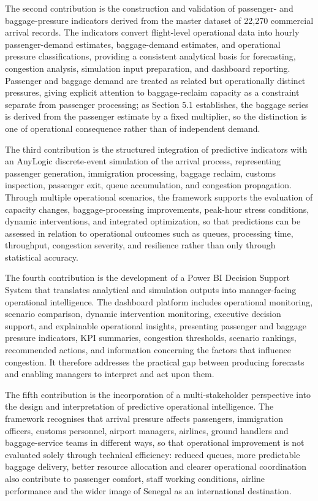 The second contribution is the construction and validation of passenger- and baggage-pressure indicators derived from the master dataset of 22,270 commercial arrival records. The indicators convert flight-level operational data into hourly passenger-demand estimates, baggage-demand estimates, and operational pressure classifications, providing a consistent analytical basis for forecasting, congestion analysis, simulation input preparation, and dashboard reporting. Passenger and baggage demand are treated as related but operationally distinct pressures, giving explicit attention to baggage-reclaim capacity as a constraint separate from passenger processing; as Section 5.1 establishes, the baggage series is derived from the passenger estimate by a fixed multiplier, so the distinction is one of operational consequence rather than of independent demand.

The third contribution is the structured integration of predictive indicators with an AnyLogic discrete-event simulation of the arrival process, representing passenger generation, immigration processing, baggage reclaim, customs inspection, passenger exit, queue accumulation, and congestion propagation. Through multiple operational scenarios, the framework supports the evaluation of capacity changes, baggage-processing improvements, peak-hour stress conditions, dynamic interventions, and integrated optimization, so that predictions can be assessed in relation to operational outcomes such as queues, processing time, throughput, congestion severity, and resilience rather than only through statistical accuracy.

The fourth contribution is the development of a Power BI Decision Support System that translates analytical and simulation outputs into manager-facing operational intelligence. The dashboard platform includes operational monitoring, scenario comparison, dynamic intervention monitoring, executive decision support, and explainable operational insights, presenting passenger and baggage pressure indicators, KPI summaries, congestion thresholds, scenario rankings, recommended actions, and information concerning the factors that influence congestion. It therefore addresses the practical gap between producing forecasts and enabling managers to interpret and act upon them.

The fifth contribution is the incorporation of a multi-stakeholder perspective into the design and interpretation of predictive operational intelligence. The framework recognises that arrival pressure affects passengers, immigration officers, customs personnel, airport managers, airlines, ground handlers and baggage-service teams in different ways, so that operational improvement is not evaluated solely through technical efficiency: reduced queues, more predictable baggage delivery, better resource allocation and clearer operational coordination also contribute to passenger comfort, staff working conditions, airline performance and the wider image of Senegal as an international destination.

